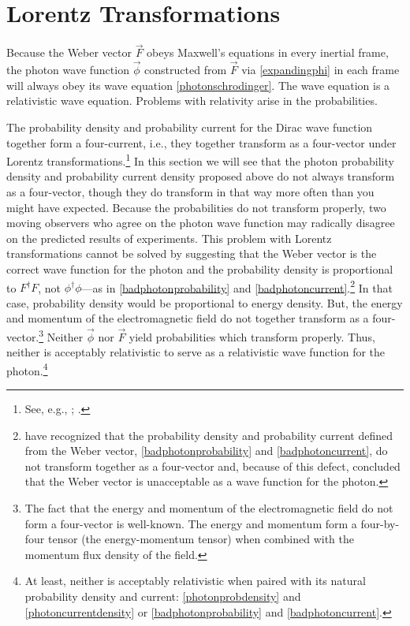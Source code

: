\documentclass[12pt,secnumarabic,amsmath,amssymb,balancelastpage,nofootinbib]{article}
\begin{document}
\section{Lorentz Transformations}\label{EXsection}

Because the Weber vector $\vec{F}$ obeys Maxwell's equations in every inertial frame, the photon wave function $\vec{\phi}$ constructed from $\vec{F}$ via \eqref{expandingphi} in each frame will always obey its wave equation \eqref{photonschrodinger}.  The wave equation is a relativistic wave equation.  Problems with relativity arise in the probabilities.

The probability density and probability current for the Dirac wave function together form a four-current, i.e., they together transform as a four-vector under Lorentz transformations.\footnote{See, e.g., \citet[sec.\ 1.3 and 2.2]{bjorkendrell}; \citet[sec.\ 4c]{schweberQFT}.}  In this section we will see that the photon probability density and probability current density proposed above do not always transform as a four-vector, though they do transform in that way more often than you might have expected.  Because the probabilities do not transform properly, two moving observers who agree on the photon wave function may radically disagree on the predicted results of experiments.  This problem with Lorentz transformations cannot be solved by suggesting that the Weber vector is the correct wave function for the photon and the probability density is proportional to $F^\dagger F$, not $\phi^\dagger \phi$---as in \eqref{badphotonprobability} and \eqref{badphotoncurrent}.\footnote{\citet{kiessling2017} have recognized that the probability density and probability current defined from the Weber vector, \eqref{badphotonprobability} and \eqref{badphotoncurrent}, do not transform together as a four-vector and, because of this defect, concluded that the Weber vector is unacceptable as a wave function for the photon.}  In that case, probability density would be proportional to energy density.  But, the energy and momentum of the electromagnetic field do not together transform as a four-vector.\footnote{The fact that the energy and momentum of the electromagnetic field do not form a four-vector is well-known.  The energy and momentum form a four-by-four tensor (the energy-momentum tensor) when combined with the momentum flux density of the field.}  Neither $\vec{\phi}$ nor $\vec{F}$ yield probabilities which transform properly.  Thus, neither is acceptably relativistic to serve as a relativistic wave function for the photon.\footnote{At least, neither is acceptably relativistic when paired with its natural probability density and current: \eqref{photonprobdensity} and \eqref{photoncurrentdensity} or \eqref{badphotonprobability} and \eqref{badphotoncurrent}.}
\end{document}
